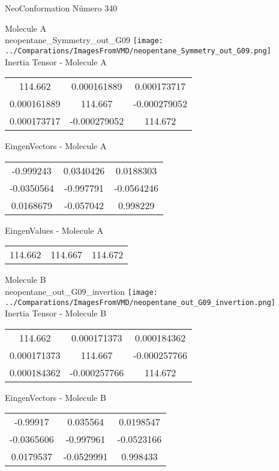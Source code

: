 \vtab[-2cm]
\begin{center}
{\large NeoConformation \tab Número 340}
\end{center}
\begin{multicols}{2}
\begin{center}

Molecule A \\ 
neopentane\_Symmetry\_out\_G09
\texttt{[image: ../Comparations/ImagesFromVMD/neopentane\_Symmetry\_out\_G09.png]}
\\
Inertia Tensor - Molecule A \\
\vtab

\begin{tabular}{|c c c|}
114.662	 & 	0.000161889	 & 	0.000173717	 \\
0.000161889	 & 	114.667	 & 	-0.000279052	 \\
0.000173717	 & 	-0.000279052	 & 	114.672
\end{tabular}

\vtab
 EingenVectors - Molecule A     \\
\vtab
\begin{tabular}{|c c c|}
-0.999243	 & 	0.0340426	 & 	0.0188303	 \\
-0.0350564	 & 	-0.997791	 & 	-0.0564246	 \\
0.0168679	 & 	-0.057042	 & 	0.998229
\end{tabular}

\vtab
 EingenValues - Molecule A     \\
\vtab
\begin{tabular}{|c c c|}
114.662	 & 	114.667	 & 	114.672	 \\
\end{tabular}
\columnbreak

Molecule B \\ 
neopentane\_out\_G09\_invertion
\texttt{[image: ../Comparations/ImagesFromVMD/neopentane\_out\_G09\_invertion.png]}
\\
Inertia Tensor - Molecule B \\
\vtab

\begin{tabular}{|c c c|}
114.662	 & 	0.000171373	 & 	0.000184362	 \\
0.000171373	 & 	114.667	 & 	-0.000257766	 \\
0.000184362	 & 	-0.000257766	 & 	114.672
\end{tabular}

\vtab
 EingenVectors - Molecule B     \\
\vtab
\begin{tabular}{|c c c|}
-0.99917	 & 	0.035564	 & 	0.0198547	 \\
-0.0365606	 & 	-0.997961	 & 	-0.0523166	 \\
0.0179537	 & 	-0.0529991	 & 	0.998433
\end{tabular}


\end{center}
\end{multicols}
